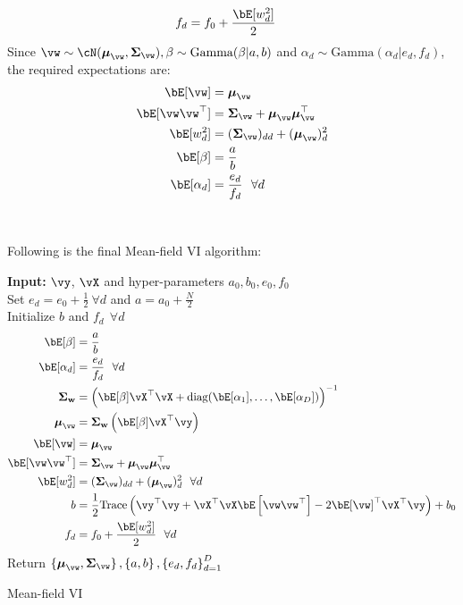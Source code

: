 \documentclass[a4paper,11pt]{article}
\begin{document}
\begin{pmisolution}
\begin{align*}
    f_d &=  f_0 +  \frac{\bE[w_d^2]}{2}
\end{align*}
Since $\vw \sim \cN(\boldsymbol{\mu}_{\vw}, \boldsymbol{\Sigma}_{\vw}), \beta \sim \text{Gamma}(\beta | a, b)$ and $\alpha_d \sim \text{Gamma}(\alpha_d | e_d, f_d)$, the required expectations are:
\begin{equation*}
\begin{split}
    \bE[\vw] &= \boldsymbol{\mu}_{\vw}
    \\\bE[\vw \vw^\top] &= \boldsymbol{\Sigma}_{\vw} + \boldsymbol{\mu}_{\vw} \boldsymbol{\mu}_{\vw}^\top
    \\\bE[w_d^2] &= (\boldsymbol{\Sigma}_{\vw})_{dd} + (\boldsymbol{\mu}_{\vw})^2_{d} 
    \\\bE[\beta] &= \frac{a}{b}
    \\\bE[\alpha_d] &= \frac{e_d}{f_d} ~~ \forall d
\end{split}
\end{equation*}
\\ \\
\noindent Following is the final Mean-field VI algorithm:\\
\begin{algorithm}[H]
\textbf{Input:} $\vy$, $\vX$ and hyper-parameters $a_0, b_0, e_0, f_0$\\
\SetAlgoLined
 Set $e_d = e_0 + \frac{1}{2} ~ \forall d$ and $a = a_0 + \frac{N}{2}$\\
 Initialize $b$ and ${f_d} ~~ \forall d$\\
  {
    \begin{align}
        \bE[\beta] &= \frac{a}{b}
        \nonumber
        \\
        \bE[\alpha_d] &= \frac{e_d}{f_d} ~~ \forall d
        \nonumber
        \\ \boldsymbol{\Sigma}_{\textbf{w}} &= \left(\bE[\beta]\vX^\top\vX + \text{diag}(\bE[\alpha_1], \ldots, \bE[\alpha_D])\right)^{-1}
        \nonumber
        \\\boldsymbol{\mu}_{\vw} &= \boldsymbol{\Sigma}_{\textbf{w}} \left( \bE[\beta]\vX^\top\vy \right)
        \nonumber
        \\\bE[\vw] &= \boldsymbol{\mu}_{\vw} \nonumber
        \\\bE[\vw \vw^\top] &= \boldsymbol{\Sigma}_{\vw} + \boldsymbol{\mu}_{\vw} \boldsymbol{\mu}_{\vw}^\top \nonumber
        \\\bE[w_d^2] &= (\boldsymbol{\Sigma}_{\vw})_{dd} + (\boldsymbol{\mu}_{\vw})^2_{d} ~~ \forall d \nonumber
        \\b &= \frac{1}{2} \text{Trace}\left(\vy^\top\vy + \vX^\top\vX\bE\left[\vw\vw^\top\right] - 2\bE[\vw]^\top\vX^\top\vy \right) + b_0
        \nonumber
        \\
        f_d &= f_0 + \frac{\bE[w_d^2]}{2} ~~ \forall d
        \nonumber
    \end{align}  
 }
 Return $\left\{\boldsymbol{\mu}_{\vw}, \boldsymbol{\Sigma}_{\vw} \right\}, \left\{a, b\right\}, \left\{e_d, f_d\right\}_{d=1}^D$
 \caption{Mean-field VI}
\end{algorithm}

\end{pmisolution}
\end{document}
